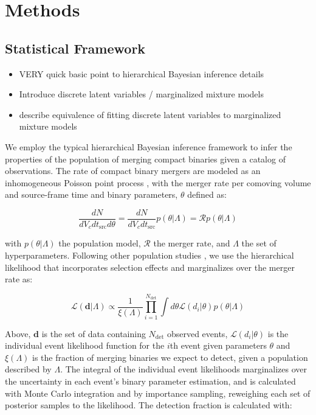 \section{Methods} \label{sec:methods}

\subsection{Statistical Framework} \label{sec:statistical_framework}

\begin{itemize}
    \item VERY quick basic point to hierarchical Bayesian inference details
    \item Introduce discrete latent variables / marginalized mixture models
    \item describe equivalence of fitting discrete latent variables to marginalized mixture models
\end{itemize}

We employ the typical hierarchical Bayesian inference framework to infer the properties of the population of merging compact binaries given a catalog of observations. The rate of compact binary mergers are modeled as an inhomogeneous Poisson point process \citep{10.1093/mnras/stz896}, with the merger rate per comoving volume \citep{astro-ph/9905116} and source-frame time and binary parameters, $\theta$ defined as: 

\begin{equation} \label{eq:rate}
    \frac{dN}{dV_cdt_\mathrm{src}d\theta} = \frac{dN}{dV_cdt_\mathrm{src}} p(\theta | \Lambda) = \mathcal{R} p(\theta | \Lambda)
\end{equation}

\noindent with $p(\theta | \Lambda)$ the population model, $\mathcal{R}$ the merger rate, and $\Lambda$ the set of hyperparameters. Following other population studies \citep{10.1093/mnras/stz896,2007.05579,2010.14533,2111.03634}, we use the hierarchical likelihood that incorporates selection effects and marginalizes over the merger rate as: 

\begin{equation} \label{eq:likelihood}
    \mathcal{L}(\bm{d} | \Lambda) \propto \frac{1}{\xi(\Lambda)} \prod_{i=1}^{N_\mathrm{det}} \int d\theta \mathcal{L}(d_i | \theta) p(\theta | \Lambda)
\end{equation}

\noindent Above, $\bm{d}$ is the set of data containing $N_\mathrm{det}$ observed events, $\mathcal{L}(d_i | \theta)$ is the individual event likelihood function for the $i$th event given parameters $\theta$ and $\xi(\Lambda)$ is the fraction of merging binaries we expect to detect, given a population described by $\Lambda$. The integral of the individual event likelihoods marginalizes over the uncertainty in each event's binary parameter estimation, and is calculated with Monte Carlo integration and by importance sampling, reweighing each set of posterior samples to the likelihood. The detection fraction is calculated with:

